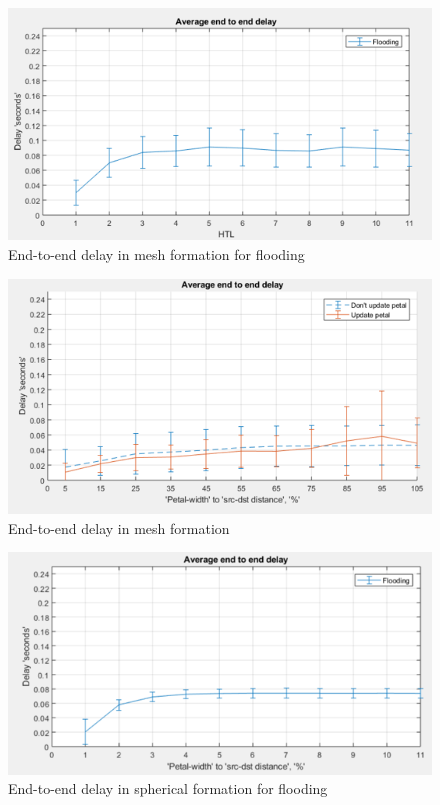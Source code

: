 \begin{figure}[hbtp]
\centering
\includegraphics[width=1\textwidth]{ncsuthesis-0.6/Chapter-5/figs/fl_delay_mesh.png}
\caption{End-to-end delay in mesh formation for flooding}
\label{fig:fl_delay_mesh}
\end{figure}

\begin{figure}[hbtp]
\centering
\includegraphics[width=1\textwidth]{ncsuthesis-0.6/Chapter-5/figs/pe_delay_mesh.png}
\caption{End-to-end delay in mesh formation}
\label{fig:pe_delay_mesh}
\end{figure}

\begin{figure}[hbtp]
\centering
\includegraphics[width=1\textwidth]{ncsuthesis-0.6/Chapter-5/figs/fl_delay_spherical.png}
\caption{End-to-end delay in spherical formation for flooding}
\label{fig:fl_delay_spherical}
\end{figure}

